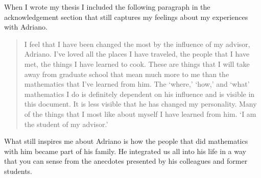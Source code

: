\documentclass{amsart}
\begin{document}
When I wrote my thesis I included the following paragraph in the acknowledgement
section that still captures my feelings about my experiences with Adriano.

\begin{quote}
I feel that I have been changed the most by the influence of my advisor, Adriano.
I've loved all the places I have traveled, the people that I have met, the things I have
learned to cook. These are things that I will take away from graduate school that mean
much more to me than the mathematics that I've learned from him. The `where,' `how,'
and `what' mathematics I do is definitely dependent on his influence and is visible in
this document. It is less visible that he has changed my personality. Many of the things
that I most like about myself I have learned from him. `I am the student of my advisor.'
\end{quote}

What still inspires me about Adriano is how the people that did mathematics with him
became part of his family.  He integrated us all into his life in a way that
you can sense from the anecdotes presented by his colleagues and former students.
\end{document}
